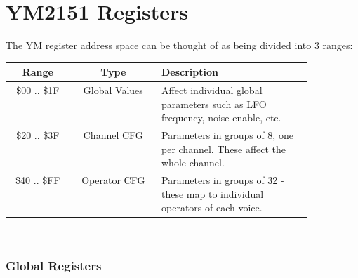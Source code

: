 \chapter{YM2151 Registers}

The YM register address space can be thought of as being divided into 3 ranges:\\

\begin{tabular}{|c|c|p{0.5\linewidth}|}
	\hline
	Range & Type & Description \\ \hline
	\$00 .. \$1F & Global Values & Affect individual global parameters such as LFO frequency, noise enable, etc. \\ \hline
	\$20 .. \$3F & Channel CFG & Parameters in groups of 8, one per channel. These affect the whole channel. \\ \hline
	\$40 .. \$FF & Operator CFG & Parameters in groups of 32 - these map to individual operators of each voice. \\ \hline
\end{tabular}\\

\subsection{Global Registers}

